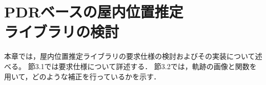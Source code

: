 


\section{PDRベースの屋内位置推定\\ライブラリの検討}
本章では，屋内位置推定ライブラリの要求仕様の検討およびその実装について述べる。
節3.1では要求仕様について詳述する．
節3.2では，軌跡の画像と関数を用いて，どのような補正を行っているかを示す．









